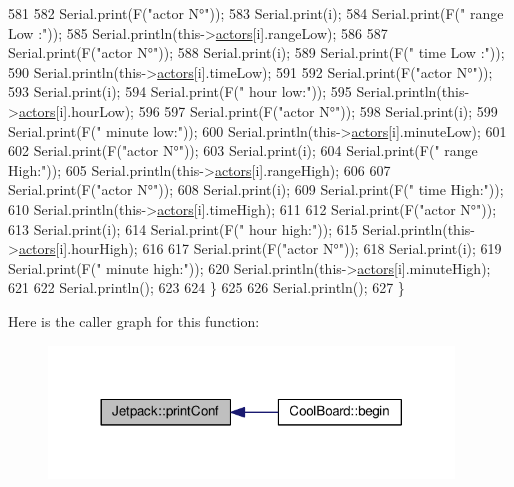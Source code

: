 \begin{DoxyCode}
581 
582         Serial.print(F(\textcolor{stringliteral}{"actor N°"}));
583         Serial.print(i);
584         Serial.print(F(\textcolor{stringliteral}{" range Low :"}));
585         Serial.println(this->\hyperlink{class_jetpack_a7e16d2f97837f9712a2e6de1c50d99db}{actors}[i].rangeLow);
586 
587         Serial.print(F(\textcolor{stringliteral}{"actor N°"}));
588         Serial.print(i);
589         Serial.print(F(\textcolor{stringliteral}{" time Low :"}));
590         Serial.println(this->\hyperlink{class_jetpack_a7e16d2f97837f9712a2e6de1c50d99db}{actors}[i].timeLow);
591 
592         Serial.print(F(\textcolor{stringliteral}{"actor N°"}));
593         Serial.print(i);
594         Serial.print(F(\textcolor{stringliteral}{" hour low:"}));
595         Serial.println(this->\hyperlink{class_jetpack_a7e16d2f97837f9712a2e6de1c50d99db}{actors}[i].hourLow);
596 
597         Serial.print(F(\textcolor{stringliteral}{"actor N°"}));
598         Serial.print(i);
599         Serial.print(F(\textcolor{stringliteral}{" minute low:"}));
600         Serial.println(this->\hyperlink{class_jetpack_a7e16d2f97837f9712a2e6de1c50d99db}{actors}[i].minuteLow);
601 
602         Serial.print(F(\textcolor{stringliteral}{"actor N°"}));
603         Serial.print(i);
604         Serial.print(F(\textcolor{stringliteral}{" range High:"}));
605         Serial.println(this->\hyperlink{class_jetpack_a7e16d2f97837f9712a2e6de1c50d99db}{actors}[i].rangeHigh);
606 
607         Serial.print(F(\textcolor{stringliteral}{"actor N°"}));
608         Serial.print(i);
609         Serial.print(F(\textcolor{stringliteral}{" time High:"}));
610         Serial.println(this->\hyperlink{class_jetpack_a7e16d2f97837f9712a2e6de1c50d99db}{actors}[i].timeHigh);
611 
612         Serial.print(F(\textcolor{stringliteral}{"actor N°"}));
613         Serial.print(i);
614         Serial.print(F(\textcolor{stringliteral}{" hour high:"}));
615         Serial.println(this->\hyperlink{class_jetpack_a7e16d2f97837f9712a2e6de1c50d99db}{actors}[i].hourHigh);
616 
617         Serial.print(F(\textcolor{stringliteral}{"actor N°"}));
618         Serial.print(i);
619         Serial.print(F(\textcolor{stringliteral}{" minute high:"}));
620         Serial.println(this->\hyperlink{class_jetpack_a7e16d2f97837f9712a2e6de1c50d99db}{actors}[i].minuteHigh);
621 
622         Serial.println(); 
623 
624     \}
625 
626     Serial.println();
627 \}
\end{DoxyCode}
Here is the caller graph for this function\+:\nopagebreak
\begin{figure}[H]
\begin{center}
\leavevmode
\includegraphics[width=305pt]{df/d1d/class_jetpack_ac54a7bb4f9166bee32052253d9b1d306_icgraph}
\end{center}
\end{figure}
